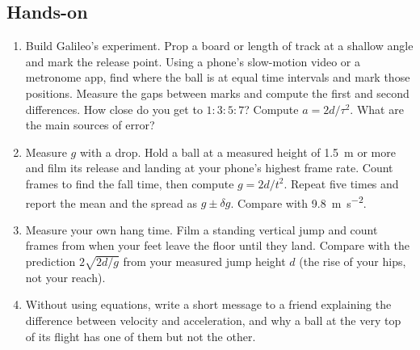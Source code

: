 \documentclass[11pt,twoside,openany]{book}
\begin{document}
\subsection*{Hands-on}
\begin{enumerate}[label=\textbf{\thechapter.\arabic*},resume=exercises,leftmargin=*]
  \item Build Galileo's experiment. Prop a board or length of track at a shallow angle and mark the release point. Using a phone's slow-motion video or a metronome app, find where the ball is at equal time intervals and mark those positions. Measure the gaps between marks and compute the first and second differences. How close do you get to $1:3:5:7$? Compute $a = 2d/\tau^2$. What are the main sources of error?
  \item Measure $g$ with a drop. Hold a ball at a measured height of \SI{1.5}{\metre} or more and film its release and landing at your phone's highest frame rate. Count frames to find the fall time, then compute $g = 2d/t^2$. Repeat five times and report the mean and the spread as $g \pm \delta g$. Compare with \SI{9.8}{\metre\per\second\squared}.
  \item Measure your own hang time. Film a standing vertical jump and count frames from when your feet leave the floor until they land. Compare with the prediction $2\sqrt{2d/g}$ from your measured jump height $d$ (the rise of your hips, not your reach).
  \item Without using equations, write a short message to a friend explaining the difference between velocity and acceleration, and why a ball at the very top of its flight has one of them but not the other.
\end{enumerate}
\end{document}
